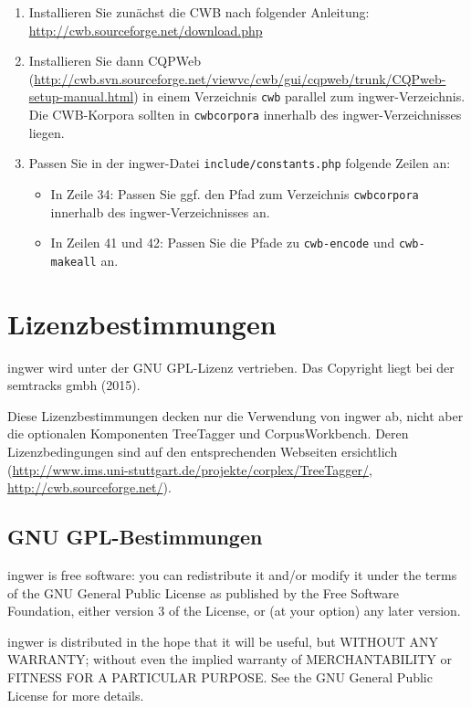 \documentclass[11pt]{scrartcl} %
\begin{document}
\begin{enumerate}
\item Installieren Sie zun\"achst die CWB nach folgender Anleitung: \url{http://cwb.sourceforge.net/download.php}
\item Installieren Sie dann CQPWeb (\url{http://cwb.svn.sourceforge.net/viewvc/cwb/gui/cqpweb/trunk/CQPweb-setup-manual.html}) in einem Verzeichnis \texttt{cwb} parallel zum ingwer-Verzeichnis. Die CWB-Korpora sollten in \texttt{cwbcorpora} innerhalb des ingwer-Verzeichnisses liegen.
\item Passen Sie in der ingwer-Datei \texttt{include/constants.php} folgende Zeilen an:
\begin{itemize}
\item In Zeile 34: Passen Sie ggf. den Pfad zum Verzeichnis \texttt{cwbcorpora} innerhalb des ingwer-Verzeichnisses an.
\item In Zeilen 41 und 42: Passen Sie die Pfade zu \texttt{cwb-encode} und \texttt{cwb-makeall} an.
\end{itemize}
\end{enumerate}

\section{Lizenzbestimmungen}

ingwer wird unter der GNU GPL-Lizenz vertrieben. Das Copyright liegt bei der semtracks gmbh (2015).

Diese Lizenzbestimmungen decken nur die Verwendung von ingwer ab, nicht aber die optionalen Komponenten TreeTagger und CorpusWorkbench. Deren Lizenzbedingungen sind auf den entsprechenden Webseiten ersichtlich (\url{http://www.ims.uni-stuttgart.de/projekte/corplex/TreeTagger/}, \url{http://cwb.sourceforge.net/}).

\subsection{GNU GPL-Bestimmungen}

ingwer is free software: you can redistribute it and/or modify
it under the terms of the GNU General Public License as published by
the Free Software Foundation, either version 3 of the License, or
(at your option) any later version.

ingwer is distributed in the hope that it will be useful,
but WITHOUT ANY WARRANTY; without even the implied warranty of
MERCHANTABILITY or FITNESS FOR A PARTICULAR PURPOSE.  See the
GNU General Public License for more details.
\end{document}
